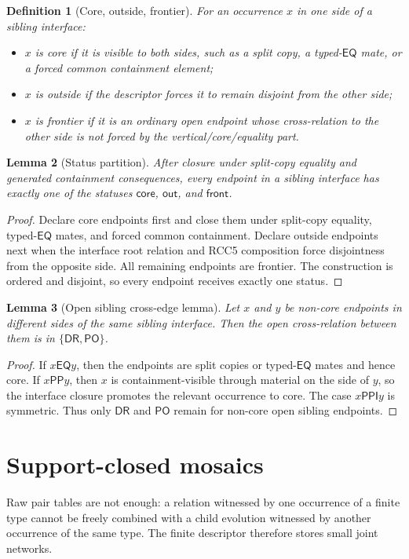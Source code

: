 \documentclass[11pt]{article}
\newtheorem{definition}{Definition}[section]
\newtheorem{lemma}[definition]{Lemma}
\theoremstyle{remark}
\newcommand{\DR}{\mathsf{DR}}
\newcommand{\PO}{\mathsf{PO}}
\newcommand{\PP}{\mathsf{PP}}
\newcommand{\PPI}{\mathsf{PPI}}
\newcommand{\EQ}{\mathsf{EQ}}
\newcommand{\core}{\mathsf{core}}
\newcommand{\front}{\mathsf{front}}
\newcommand{\out}{\mathsf{out}}
\begin{document}
\begin{definition}[Core, outside, frontier]\label{def:status}
For an occurrence $x$ in one side of a sibling interface:
\begin{itemize}
\item $x$ is \emph{core} if it is visible to both sides, such as a split copy, a typed-$\EQ$ mate, or a forced common containment element;
\item $x$ is \emph{outside} if the descriptor forces it to remain disjoint from the other side;
\item $x$ is \emph{frontier} if it is an ordinary open endpoint whose cross-relation to the other side is not forced by the vertical/core/equality part.
\end{itemize}
\end{definition}

\begin{lemma}[Status partition]\label{lem:status-partition}
After closure under split-copy equality and generated containment consequences, every endpoint in a sibling interface has exactly one of the statuses $\core$, $\out$, and $\front$.
\end{lemma}
\begin{proof}
Declare core endpoints first and close them under split-copy equality, typed-$\EQ$ mates, and forced common containment.  Declare outside endpoints next when the interface root relation and RCC5 composition force disjointness from the opposite side.  All remaining endpoints are frontier.  The construction is ordered and disjoint, so every endpoint receives exactly one status.
\end{proof}

\begin{lemma}[Open sibling cross-edge lemma]\label{lem:open-cross}
Let $x$ and $y$ be non-core endpoints in different sides of the same sibling interface.  Then the open cross-relation between them is in $\{\DR,\PO\}$.
\end{lemma}
\begin{proof}
If $x\EQ y$, then the endpoints are split copies or typed-$\EQ$ mates and hence core.  If $x\PP y$, then $x$ is containment-visible through material on the side of $y$, so the interface closure promotes the relevant occurrence to core.  The case $x\PPI y$ is symmetric.  Thus only $\DR$ and $\PO$ remain for non-core open sibling endpoints.
\end{proof}

\section{Support-closed mosaics}
Raw pair tables are not enough: a relation witnessed by one occurrence of a finite type cannot be freely combined with a child evolution witnessed by another occurrence of the same type.  The finite descriptor therefore stores small joint networks.
\end{document}
